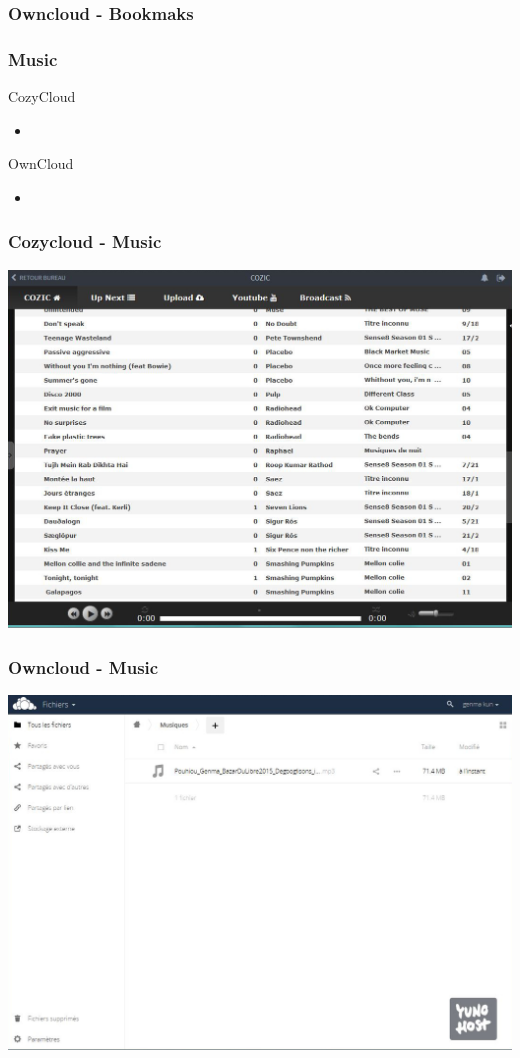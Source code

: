 \documentclass{beamer}
\begin{document}
\begin{frame}
\frametitle{Owncloud - Bookmaks}

\end{frame}

\begin{frame}
\frametitle{Music}

\begin{block}{CozyCloud}
\begin{itemize}
\item 
\end{itemize}
\end{block}

\begin{block}{OwnCloud}
\begin{itemize}
\item 
\end{itemize}
\end{block}
\end{frame}


\begin{frame}
\frametitle{Cozycloud - Music}
\includegraphics[scale=0.3] {./CozyCloud/CozyCloud_Cozic.jpg}
\end{frame}


\begin{frame}
\frametitle{Owncloud - Music}
\includegraphics[scale=0.3] {./Owncloud/Owncloud_Musiques.jpg}
\end{frame}
\end{document}
